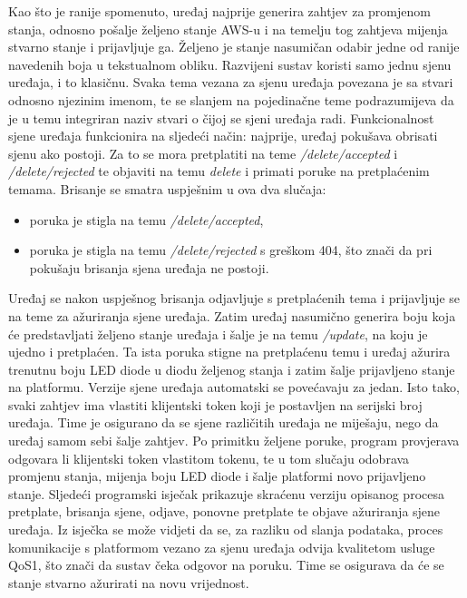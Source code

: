 Kao što je ranije spomenuto, uređaj najprije generira zahtjev za promjenom stanja, odnosno pošalje željeno stanje AWS-u i na temelju tog zahtjeva mijenja stvarno stanje i prijavljuje ga. Željeno je stanje nasumičan odabir jedne od ranije navedenih boja u tekstualnom obliku. Razvijeni sustav koristi samo jednu sjenu uređaja, i to klasičnu. Svaka tema vezana za sjenu uređaja povezana je sa stvari odnosno njezinim imenom, te se slanjem na pojedinačne teme podrazumijeva da je u temu integriran naziv stvari o čijoj se sjeni uređaja radi. Funkcionalnost sjene uređaja funkcionira na sljedeći način: najprije, uređaj pokušava obrisati sjenu ako postoji. Za to se mora pretplatiti na teme \textit{/delete/accepted} i \textit{/delete/rejected} te objaviti na temu \textit{delete} i primati poruke na pretplaćenim temama. Brisanje se smatra uspješnim u ova dva slučaja:
\begin{itemize}
	\item poruka je stigla na temu \textit{/delete/accepted},
	\item poruka je stigla na temu \textit{/delete/rejected} s greškom 404, što znači da pri pokušaju brisanja sjena uređaja ne postoji.
\end{itemize}

Uređaj se nakon uspješnog brisanja odjavljuje s pretplaćenih tema i prijavljuje se na teme za ažuriranja sjene uređaja. Zatim uređaj nasumično generira boju koja će predstavljati željeno stanje uređaja i šalje je na temu \textit{/update}, na koju je ujedno i pretplaćen. Ta ista poruka stigne na pretplaćenu temu i uređaj ažurira trenutnu boju LED diode u diodu željenog stanja i zatim šalje prijavljeno stanje na platformu. Verzije sjene uređaja automatski se povećavaju za jedan. Isto tako, svaki zahtjev ima vlastiti klijentski token koji je postavljen na serijski broj uređaja. Time je osigurano da se sjene različitih uređaja ne miješaju, nego da uređaj samom sebi šalje zahtjev. Po primitku željene poruke, program provjerava odgovara li klijentski token vlastitom tokenu, te u tom slučaju odobrava promjenu stanja, mijenja boju LED diode i šalje platformi novo prijavljeno stanje. Sljedeći programski isječak prikazuje skraćenu verziju opisanog procesa pretplate, brisanja sjene, odjave, ponovne pretplate te objave ažuriranja sjene uređaja. Iz isječka se može vidjeti da se, za razliku od slanja podataka, proces komunikacije s platformom vezano za sjenu uređaja odvija kvalitetom usluge QoS1, što znači da sustav čeka odgovor na poruku. Time se osigurava da će se stanje stvarno ažurirati na novu vrijednost.  

